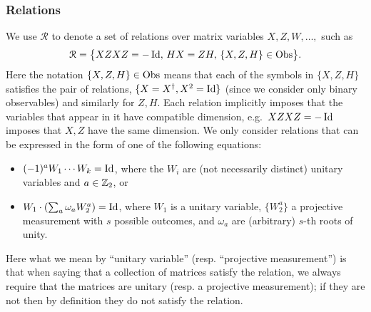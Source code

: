 \subsubsection{Relations}

We use $\mathcal{R}$ to denote a set of relations over matrix variables $X,Z,W,\ldots,$ such as
$$\mathcal{R}=\big\{XZXZ=-\mathop{\rm Id}\nolimits,\, HX=ZH,\,\{X,Z,H\}\in\mathrm{Obs}\big\}.$$
Here the notation $\{X,Z,H\}\in\mathrm{Obs}$ means that each of the symbols in $\{X,Z,H\}$ satisfies the pair of relations, $\{X=X^\dagger,X^2=\mathop{\rm Id}\nolimits\}$ (since we consider only binary observables) and similarly for $Z,H$. Each relation implicitly imposes that the variables that appear in it have compatible dimension, e.g.\ $XZXZ=-\mathop{\rm Id}\nolimits$ imposes that $X,Z$ have the same dimension. 
We only consider relations that can be expressed in the form of  one of the following
equations:
\begin{itemize}
  \item  $(-1)^a W_1\cdots W_k = \mathop{\rm Id}\nolimits$, where the $W_i$ are (not necessarily distinct) unitary variables and $a\in\mathbb{Z}_2$, or
  \item $ W_1 \cdot ( \sum_a \omega_a W_2^a)=\mathop{\rm Id}\nolimits$, where $W_1$ is a unitary variable, $\{W_2^a\}$ a projective measurement with $s$ possible outcomes, and $\omega_a$ are (arbitrary) $s$-th roots of unity.
\end{itemize}
Here what we mean by ``unitary variable'' (resp. ``projective measurement'') is that when saying that a collection of matrices satisfy the relation, we always require that the matrices are unitary (resp. a projective measurement); if they are not then by definition they do not satisfy the relation. 

